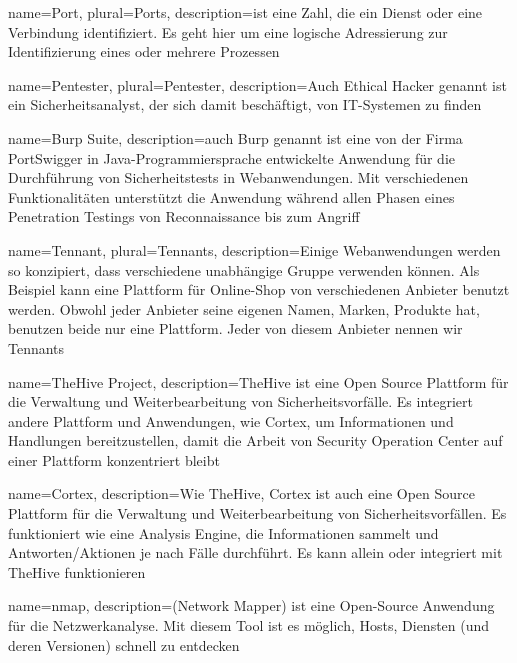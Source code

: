  {
    name={Port},
    plural={Ports},
    description={ist eine Zahl, die ein Dienst oder eine Verbindung identifiziert. Es geht hier um eine logische Adressierung zur Identifizierung eines oder mehrere Prozessen \citep{porttanenbaum}}
}

 {
    name={Pentester},
    plural={Pentester},
    description={Auch Ethical Hacker genannt ist ein Sicherheitsanalyst, der sich damit beschäftigt,   von IT-Systemen zu finden \citep{pentester}}   
}

 {
    name={Burp Suite},
    description={auch Burp genannt ist eine von der Firma PortSwigger in Java-Programmiersprache entwickelte Anwendung für die Durchführung von Sicherheitstests in Webanwendungen. Mit verschiedenen Funktionalitäten unterstützt die Anwendung während allen Phasen eines Penetration Testings von Reconnaissance bis zum Angriff \citep{burp}}   
}

 {
    name={Tennant},
    plural={Tennants},
    description={Einige Webanwendungen werden so konzipiert, dass verschiedene unabhängige Gruppe verwenden können. Als Beispiel kann eine Plattform für Online-Shop von verschiedenen Anbieter benutzt werden. Obwohl jeder Anbieter seine eigenen Namen, Marken, Produkte hat, benutzen beide nur eine Plattform. Jeder von diesem Anbieter nennen wir Tennants}   
}

 {
    name={TheHive Project},
    description={TheHive ist eine Open Source Plattform für die Verwaltung und Weiterbearbeitung von Sicherheitsvorfälle. Es integriert andere Plattform und Anwendungen, wie Cortex, um Informationen und Handlungen bereitzustellen, damit die Arbeit von Security Operation Center auf einer Plattform konzentriert bleibt \citep{TheHive}}   
}

 {
    name={Cortex},
    description={Wie \gls{TheHive}, Cortex ist auch eine Open Source Plattform für die Verwaltung und Weiterbearbeitung von Sicherheitsvorfällen. Es funktioniert wie eine Analysis Engine, die Informationen sammelt und Antworten/Aktionen je nach Fälle durchführt. Es kann allein oder integriert mit TheHive funktionieren \citep{TheHive}}   
}

 {
    name={nmap},
    description={(Network Mapper) ist eine Open-Source Anwendung für die Netzwerkanalyse. Mit diesem Tool ist es möglich, Hosts, Diensten (und deren Versionen) schnell
    zu entdecken \citep{nmap}}    
}

